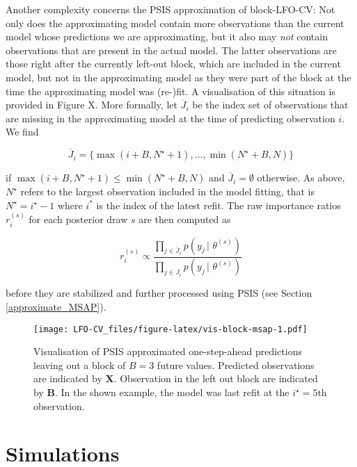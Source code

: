 \documentclass[american,]{article}
\begin{document}
Another complexity concerns the PSIS approximation of block-LFO-CV: Not only
does the approximating model contain more observations than the current model
whose predictions we are approximating, but it also may \emph{not} contain
observations that are present in the actual model. The latter observations are
those right after the currently left-out block, which are included in the
current model, but not in the approximating model as they were part of the block
at the time the approximating model was (re-)fit. A visualisation of this
situation is provided in Figure X. More formally, let \(\overline{J}_i\) be the
index set of observations that are missing in the approximating model at the
time of predicting observation \(i\). We find

\begin{equation}
\overline{J}_i = \{ \max(i + B, N^\star + 1), \ldots, \min(N^\star + B, N) \}
\end{equation}

if \(\max(i + B, N^\star + 1) \leq \min(N^\star + B, N)\) and
\(\overline{J}_i = \emptyset\) otherwise. As above, \(N^\star\) refers to the
largest observation included in the model fitting, that is
\(N^\star = i^\star - 1\) where \(i^*\) is the index of the latest refit. The raw
importance ratios \(r_i^{(s)}\) for each posterior draw \(s\) are then computed as

\begin{equation}
r_i^{(s)} \propto \frac{\prod_{j \in \overline{J}_i} p(y_j \,|\, \,\theta^{(s)})}
{\prod_{j \in J_i} p(y_j \,|\, \,\theta^{(s)})}
\end{equation}

before they are stabilized and further processed using PSIS (see Section
\ref{approximate_MSAP}).

\begin{figure}
\centering
\texttt{[image: LFO-CV\_files/figure-latex/vis-block-msap-1.pdf]}
\caption{\label{fig:vis-block-msap}Visualisation of PSIS approximated one-step-ahead predictions leaving out a block of \(B = 3\) future values. Predicted observations are indicated by \textbf{X}. Observation in the left out block are indicated by \textbf{B}. In the shown example, the model was last refit at the \(i^\star = 5\)th observation.}
\end{figure}

\hypertarget{simulations}{%
\section{Simulations}\label{simulations}}
\end{document}
